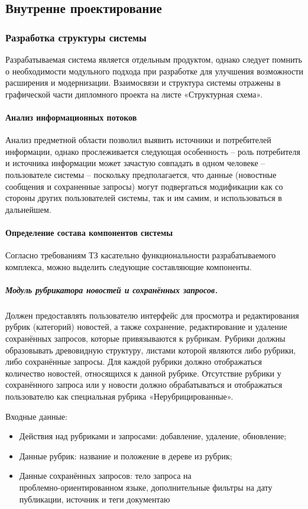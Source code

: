 \clearpage
\subsection{Внутренне проектирование}
\subsubsection{Разработка структуры системы}

Разрабатываемая система является отдельным продуктом, однако следует помнить о необходимости модульного подхода при разработке для улучшения возможности расширения и модернизации. Взаимосвязи и структура системы отражены в графической части дипломного проекта на листе «Структурная схема».

\paragraph{Анализ информационных потоков}

Анализ предметной области позволил выявить источники и потребителей информации, однако прослеживается следующая особенность -- роль потребителя и источника информации может зачастую совпадать в одном человеке -- пользователе системы -- поскольку предполагается, что данные (новостные сообщения и сохраненные запросы) могут подвергаться модификации как со стороны других пользователей системы, так и им самим, и использоваться в дальнейшем.

\paragraph{Определение состава компонентов системы}
Согласно требованиям ТЗ касательно функциональности разрабатываемого комплекса, можно выделить следующие составляющие компоненты.

\subparagraph{Модуль рубрикатора новостей и сохранённых запросов.}
Должен предоставлять пользователю интерфейс для просмотра и редактирования рубрик (категорий) новостей, а также сохранение, редактирование и удаление сохранённых запросов, которые привязываются к рубрикам. Рубрики должны образовывать древовидную структуру, листами которой являются либо рубрики, либо сохранённые запросы. Для каждой рубрики должно отображаться количество новостей, относящихся к данной рубрике. Отсутствие рубрики у сохранённого запроса или у новости должно обрабатываться и отображаться пользователю как специальная рубрика «Нерубрицированные».

Входные данные:
\begin{itemize}
\item Действия над рубриками и запросами: добавление, удаление, обновление;
\item Данные рубрик: название и положение в дереве из рубрик;
\item Данные сохранённых запросов: тело запроса на \\ проблемно-ориентированном языке, дополнительные фильтры на дату публикации, источник и теги документаю
\end{itemize}

